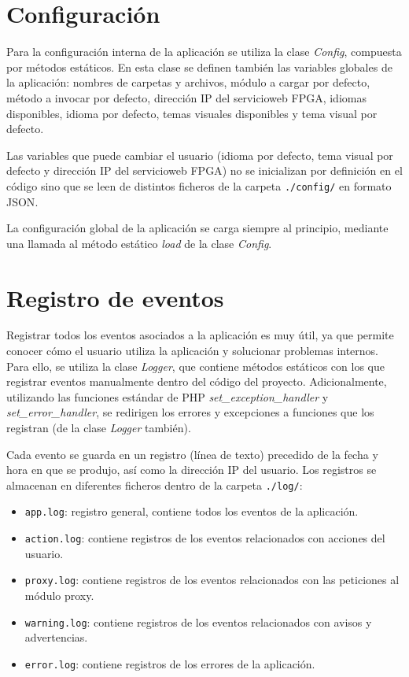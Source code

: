 \section{Configuración\label{extra:mvc:config}}

Para la configuración interna de la aplicación se utiliza la clase \textit{Config}, compuesta por métodos estáticos.
En esta clase se definen también las variables globales de la aplicación: nombres de carpetas y archivos, módulo a cargar por defecto, método a invocar por defecto, dirección IP del \gls{servicioweb} \gls{FPGA}, idiomas disponibles, idioma por defecto, temas visuales disponibles y tema visual por defecto.

Las variables que puede cambiar el usuario (idioma por defecto, tema visual por defecto y dirección IP del \gls{servicioweb} \gls{FPGA}) no se inicializan por definición en el código sino que se leen de distintos ficheros de la carpeta \texttt{./config/} en formato \gls{JSON}.

La configuración global de la aplicación se carga siempre al principio, mediante una llamada al método estático \textit{load} de la clase \textit{Config}.

\section{Registro de eventos\label{extra:mvc:logger}}

Registrar todos los eventos asociados a la aplicación es muy útil, ya que permite conocer cómo el usuario utiliza la aplicación y solucionar problemas internos.
Para ello, se utiliza la clase \textit{Logger}, que contiene métodos estáticos con los que registrar eventos manualmente dentro del código del proyecto.
Adicionalmente, utilizando las funciones estándar de \gls{PHP} \textit{set\_exception\_handler} y \textit{set\_error\_handler}, se redirigen los errores y excepciones a funciones que los registran (de la clase \textit{Logger} también).

Cada evento se guarda en un registro (línea de texto) precedido de la fecha y hora en que se produjo, así como la dirección IP del usuario.
Los registros se almacenan en diferentes ficheros dentro de la carpeta \texttt{./log/}:
\begin{itemize}
  \item \texttt{app.log}: registro general, contiene todos los eventos de la aplicación.
  \item \texttt{action.log}: contiene registros de los eventos relacionados con acciones del usuario.
  \item \texttt{proxy.log}: contiene registros de los eventos relacionados con las peticiones al módulo proxy.
  \item \texttt{warning.log}: contiene registros de los eventos relacionados con avisos y advertencias.
  \item \texttt{error.log}: contiene registros de los errores de la aplicación.
\end{itemize}


